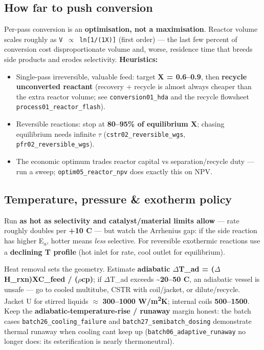\documentclass[11pt,a4paper]{article}
\providecommand{\tightlist}{\setlength{\itemsep}{0pt}\setlength{\parskip}{0pt}}
\begin{document}
\hypertarget{how-far-to-push-conversion}{%
\subsection{How far to push
conversion}\label{how-far-to-push-conversion}}

Per-pass conversion is an \textbf{optimisation, not a maximisation}.
Reactor volume scales roughly as \texttt{V\ \(\propto\)\ ln{[}1/(1\textminus{}X){]}} (first
order) --- the last few percent of conversion cost disproportionate
volume and, worse, residence time that breeds side products and erodes
selectivity. \textbf{Heuristics:}

\begin{itemize}
\tightlist
\item
  Single-pass irreversible, valuable feed: target \textbf{X = 0.6--0.9},
  then \textbf{recycle unconverted reactant} (recovery + recycle is
  almost always cheaper than the extra reactor volume; see
  \texttt{conversion01\_hda} and the recycle flowsheet
  \texttt{process01\_reactor\_flash}).
\item
  Reversible reactions: stop at \textbf{80--95\% of equilibrium X};
  chasing equilibrium needs infinite \(\tau\)
  (\texttt{cstr02\_reversible\_wgs}, \texttt{pfr02\_reversible\_wgs}).
\item
  The economic optimum trades reactor capital vs separation/recycle duty
  --- run a sweep; \texttt{optim05\_reactor\_npv} does exactly this on
  NPV.
\end{itemize}

\hypertarget{temperature-pressure--exotherm-policy}{%
\subsection{Temperature, pressure \& exotherm
policy}\label{temperature-pressure--exotherm-policy}}

Run \textbf{as hot as selectivity and catalyst/material limits allow}
--- rate roughly doubles per \textbf{+10 \textdegree{}C} --- but watch the Arrhenius
gap: if the side reaction has higher E\textsubscript{a}, hotter means \emph{less}
selective. For reversible exothermic reactions use a \textbf{declining T
profile} (hot inlet for rate, cool outlet for equilibrium).

Heat removal sets the geometry. Estimate \textbf{adiabatic \(\Delta\)T\_ad =
(\textminus{}\(\Delta\)H\_rxn)\textperiodcentered{}X\textperiodcentered{}C\_feed / (\(\rho\)\textperiodcentered{}cp)}; if \(\Delta\)T\_ad exceeds
\textasciitilde{}\textbf{20--50 \textdegree{}C}, an adiabatic vessel is unsafe ---
go to cooled multitube, CSTR with coil/jacket, or dilute/recycle. Jacket
U for stirred liquids \(\approx\) \textbf{300--1000 W/m\textsuperscript{2}K}; internal coils
\textbf{500--1500}. Keep the \textbf{adiabatic-temperature-rise /
runaway} margin honest: the batch cases \texttt{batch26\_cooling\_failure} and
\texttt{batch27\_semibatch\_dosing} demonstrate thermal runaway when cooling
can\textquotesingle t keep up (\texttt{batch06\_adaptive\_runaway} no longer
does: its esterification is nearly thermoneutral).
\end{document}
